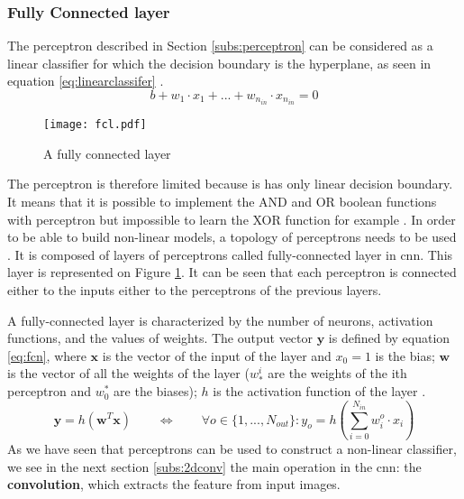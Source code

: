 \subsubsection{Fully Connected layer} \label{subs:fcl}
The perceptron described in Section \ref{subs:perceptron} can be considered as a linear classifier for which the decision boundary is the hyperplane, as seen in equation \eqref{eq:linearclassifer} \cite{matteucci_artificial_2019}.
%
\begin{equation}
    b + w_1 \cdot x_1 + ... + w_{n_{in}} \cdot x_{n_{in}} = 0
    \label{eq:linearclassifer}
\end{equation}
%
\begin{figure}
    \centering
    \texttt{[image: fcl.pdf]}
    \caption{A fully connected layer}
    \label{fig:fcn}
\end{figure}
%
The perceptron is therefore limited because is has only linear decision boundary. It means that it is possible to implement the AND and OR boolean functions with perceptron but impossible to learn the XOR function for example \cite{minsky_perceptrons_1969}. In order to be able to build non-linear models, a topology of perceptrons needs to be used \cite{khan_survey_2020}. It is composed of layers of perceptrons called fully-connected layer in \acrshort{cnn}. This layer is represented on Figure \ref{fig:fcn}. It can be seen that each perceptron is connected either to the inputs either to the perceptrons of the previous layers.

A fully-connected layer is characterized by the number of neurons, activation functions, and the values of weights. The output vector $\boldsymbol{y}$ is defined by equation \eqref{eq:fcn}, where $\boldsymbol{x}$ is the vector of the input of the layer and $x_0 = 1$ is the bias; $\boldsymbol{w}$ is the vector of all the weights of the layer ($w^i_*$ are the weights of the ith perceptron and $w^*_0$ are the biases); $h$ is the activation function of the layer \cite{abdelouahab_accelerating_2018}.
%
\begin{equation}
    \boldsymbol{y} = h(\boldsymbol{w}^T \boldsymbol{x}) \qquad \Leftrightarrow \qquad \forall o \in \{ 1, ..., N_{out} \} : y_o = h(\sum^{N_{in}}_{i=0} w^o_i \cdot x_i)
    \label{eq:fcn}
\end{equation}
%
As we have seen that perceptrons can be used to construct a non-linear classifier, we see in the next section \ref{subs:2dconv} the main operation in the \acrshort{cnn}: the \textbf{convolution}, which extracts the feature from input images.
